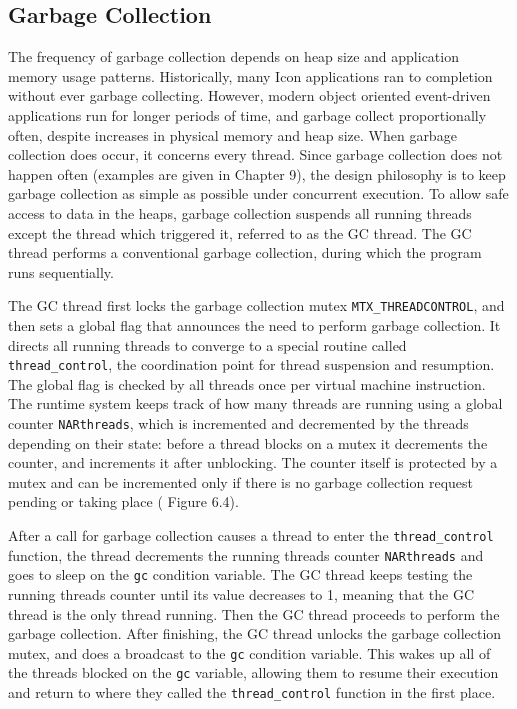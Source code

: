 \subsection{Garbage Collection}

The frequency of garbage collection depends on heap size and application
memory usage patterns.  Historically, many Icon applications ran to
completion without ever garbage collecting. However, modern object oriented
event-driven applications run for longer periods of time, and garbage
collect proportionally often, despite increases in physical memory and heap
size. When garbage collection does occur, it concerns every thread.  Since
garbage collection does not happen often (examples are given in
{\color{red} Chapter 9}), the design philosophy is to keep garbage
collection as simple as possible under concurrent execution.  To allow safe
access to data in the heaps, garbage collection suspends all running
threads except the thread which triggered it, referred to as the GC
thread. The GC thread performs a conventional garbage collection, during
which the program runs sequentially.


\label{GC-Mutex}
The GC thread first locks the garbage collection mutex
\texttt{MTX\_THREADCONTROL}, and then sets a global flag that announces the
need to perform garbage collection. It directs all running threads to
converge to a special routine called \texttt{thread\_control}, the
coordination point for thread suspension and resumption. The global flag is
checked by all threads once per virtual machine instruction.  The runtime
system keeps track of how many threads are running using a global counter
\texttt{NARthreads}, which is incremented and decremented by the threads
depending on their state: before a thread blocks on a mutex it decrements
the counter, and increments it after unblocking. The counter itself is
protected by a mutex and can be incremented only if there is no garbage
collection request pending or taking place ({\color{red} Figure 6.4}).

After a call for garbage collection causes a thread to enter the
\texttt{thread\_control} function, the thread decrements the running
threads counter \texttt{NARthreads} and goes to sleep on the \texttt{gc}
condition variable. The GC thread keeps testing the running threads counter
until its value decreases to 1, meaning that the GC thread is the only
thread running. Then the GC thread proceeds to perform the garbage
collection. After finishing, the GC thread unlocks the garbage collection
mutex, and does a broadcast to the \texttt{gc} condition variable. This
wakes up all of the threads blocked on the \texttt{gc} variable, allowing
them to resume their execution and return to where they called the
\texttt{thread\_control} function in the first place.


